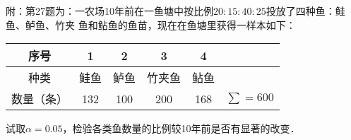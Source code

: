 \documentclass[10pt,a4paper]{article}
\begin{document}
\begin{enumerate}
\begin{enumerate}
        {\kaishu 附：第27题为：一农场10年前在一鱼塘中按比例$20:15:40:25$投放了四种鱼：鲑鱼、鲈鱼、竹夹
        鱼和鲇鱼的鱼苗，现在在鱼塘里获得一样本如下：
        \renewcommand{\arraystretch}{1.3}
        \begin{table}[H]\centering
            \begin{tabular}{c|ccccc}
            \hline
            序号    & 1   & 2   & 3   & 4   &            \\ \hline
            种类    & 鲑鱼  & 鲈鱼  & 竹夹鱼 & 鲇鱼  &            \\ \hline
            数量（条） & 132 & 100 & 200 & 168 & $\sum=600$ \\ \hline
            \end{tabular}
        \end{table}
        \renewcommand{\arraystretch}{1.0}
        试取$\alpha=0.05$，检验各类鱼数量的比例较10年前是否有显著的改变．}
    \end{enumerate}




  

\end{enumerate}
\end{document}
